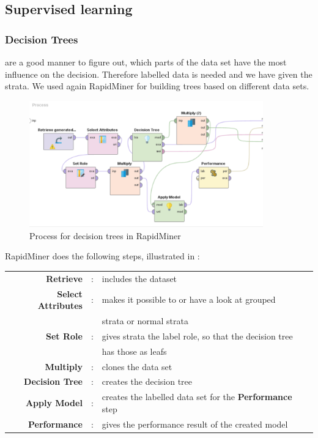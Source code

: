 		
	\subsection{Supervised learning}
	
	\subsubsection{Decision Trees} are a good manner to figure out, which parts of the data set have the most influence on the decision. Therefore labelled data is needed and we have given the strata. We used again RapidMiner for building trees based on different data sets. 
	
	\begin{figure}[!htbp]
		\centering
		\includegraphics[width = 0.9\textwidth]{DecisionTreeRapidModel.PNG}
		\caption{Process for decision trees in RapidMiner}
		\label{fig: RapDec}
	\end{figure}
	
	RapidMiner does the following steps, illustrated in :
	
	\begin{tabular}{r c l}
		\textbf{Retrieve} & : & includes the dataset\\
		\textbf{Select Attributes} & : & makes it possible to or have a look at grouped\\
		&& strata or normal strata\\
		\textbf{Set Role} & : & gives strata the label role, so that the decision tree\\
		&& has those as leafs\\
		\textbf{Multiply} & : & clones the data set \\
		\textbf{Decision Tree} &: & creates the decision tree\\
		\textbf{Apply Model} & : & creates the labelled data set for the \textbf{Performance} step\\
		\textbf{Performance} & : & gives the performance result of the created model\\
	\end{tabular}
	
